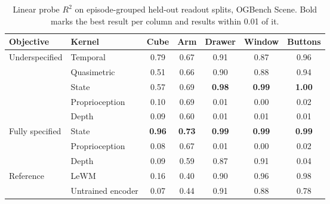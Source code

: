 \begin{table}[t]
\centering
\caption{Linear probe $R^2$ on episode-grouped held-out readout splits, OGBench Scene. Bold marks the best result per column and results within 0.01 of it.}
\label{tab:kernel_probes}
\begin{tabular}{llccccc}
\toprule
Objective & Kernel & Cube & Arm & Drawer & Window & Buttons \\
\midrule
\multirow{5}{*}{Underspecified}
 & Temporal & 0.79 & 0.67 & 0.91 & 0.87 & 0.96 \\
 & Quasimetric & 0.51 & 0.66 & 0.90 & 0.88 & 0.94 \\
 & State & 0.57 & 0.69 & \textbf{0.98} & \textbf{0.99} & \textbf{1.00} \\
 & Proprioception & 0.10 & 0.69 & 0.01 & 0.00 & 0.02 \\
 & Depth & 0.09 & 0.60 & 0.01 & 0.01 & 0.01 \\
\midrule
\multirow{3}{*}{Fully specified}
 & State & \textbf{0.96} & \textbf{0.73} & \textbf{0.99} & \textbf{0.99} & \textbf{0.99} \\
 & Proprioception & 0.08 & 0.67 & 0.01 & 0.00 & 0.02 \\
 & Depth & 0.09 & 0.59 & 0.87 & 0.91 & 0.04 \\
\midrule
\multirow{2}{*}{Reference}
 & LeWM & 0.16 & 0.40 & 0.90 & 0.96 & 0.98 \\
 & Untrained encoder & 0.07 & 0.44 & 0.91 & 0.88 & 0.78 \\
\bottomrule
\end{tabular}
\end{table}
